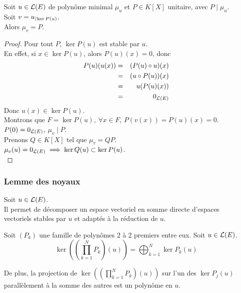 \begin{coro}
	Soit $u \in \mathcal{L}(E)$ de polynôme minimal $\mu_u$ et $P \in K[X]$ unitaire, avec $P \mid \mu_u$.\\
	Soit $v = u_{\restriction \ker P(u)}$.\\
	Alors $\mu_v = P$.
\end{coro}


\begin{proof}
	Pour tout $P$, $\ker P(u) $ est stable par $u$.\\
	En effet, si $x \in \ker P(u)$, alors $P(u)(x) = 0$, donc
	\begin{eqnarray*}
		P(u)(u(x)) &=& (P (u) \circ u)(x) \\
		&=& (u \circ P(u))(x) \\
		&=& u(P(u)(x)) \\
		&=& 0_{\mathcal{L}(E)}
	\end{eqnarray*}
	Donc $u(x) \in \ker P(u)$.\\ %

	Montrons que $F = \ker P(u), \ \forall x \in F, \ P(v(x)) = P(u)(x) = 0$.\\

	$P(0)=0_{\mathcal{L}(E)}$, $\mu_v \mid P$.\\
	Prenons $Q \in K[X]$ tel que $\mu_v = QP$.\\
	$\mu_v(u) = 0_{\mathcal{L}(E)} \implies \ker Q(u) \subset \ker P(u)$.\\
\end{proof}



\subsubsection{Lemme des noyaux}

Soit $u \in \mathcal{L}(E)$.\\
Il permet de décomposer un espace vectoriel en somme directe d'espaces vectoriels stables par $u$ et adaptés à la réduction de $u$.

\begin{lemma}
	Soit $(P_k)$ une famille de polynômes 2 à 2 premiers entre eux.
	Soit $u \in \mathcal{L}(E)$.
	$$ \ker \left(\left(\prod_{k=1}^N P_k \right)(u)\right) = \bigoplus_{k=1}^N \ker P_k(u)$$

	De plus, la projection de $\ker \left(\left(\prod\limits_{k=1}^N P_k \right)(u)\right)$ sur l'un des  $\ker P_j(u)$ parallèlement à la somme des autres est un polynôme en $u$.
\end{lemma}

